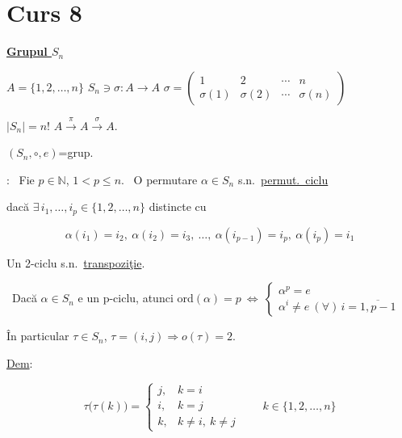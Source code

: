 \newpage
\section{Curs 8}

\begin{center}
\end{center}
\begin{flushright}
\end{flushright}

\bigskip
\noindent\underline{\textbf{Grupul $S_n$}}

\bigskip
\noindent $A=\{1,2,\ldots,n\}$ \quad $S_n \ni \sigma: A\to A$ \quad $\sigma = \begin{pmatrix}1&2&\cdots&n\\ \sigma(1)&\sigma(2)&\cdots&\sigma(n)\end{pmatrix}$

\noindent $|S_n|=n!$ \qquad $A\xrightarrow{\ \pi\ }A\xrightarrow{\ \sigma\ }A.$

\bigskip
\noindent $(S_n,\circ,e)$=grup.

\bigskip
\noindent{}: \ Fie $p\in\mathbb{N}$, $1<p\leq n$. \ O permutare $\alpha\in S_n$ s.n.\ \underline{permut.\ ciclu}

\noindent dacă $\exists\,i_1,\ldots,i_p\in\{1,2,\ldots,n\}$ distincte cu

\[
\alpha(i_1)=i_2, \ \alpha(i_2)=i_3, \ \ldots, \ \alpha(i_{p-1})=i_p, \ \alpha(i_p)=i_1
\]

\bigskip
\noindent Un 2-ciclu s.n.\ \underline{transpoziţie}.

\bigskip
\noindent{} \ Dacă $\alpha\in S_n$ e un p-ciclu, atunci ord$(\alpha)=p \ \Leftrightarrow \ \begin{cases}\alpha^p=e\\ \alpha^i\neq e \ (\forall)\,i=\overline{1,p-1}\end{cases}$

\bigskip
\noindent În particular $\tau\in S_n$, $\tau=(i,j) \Rightarrow o(\tau)=2$.

\bigskip
\noindent\underline{Dem}:

\[
\tau\big(\tau(k)\big)=
\begin{cases}
j, & k=i\\
i, & k=j\\
k, & k\neq i,\ k\neq j
\end{cases}
\qquad k\in\{1,2,\ldots,n\}
\]

